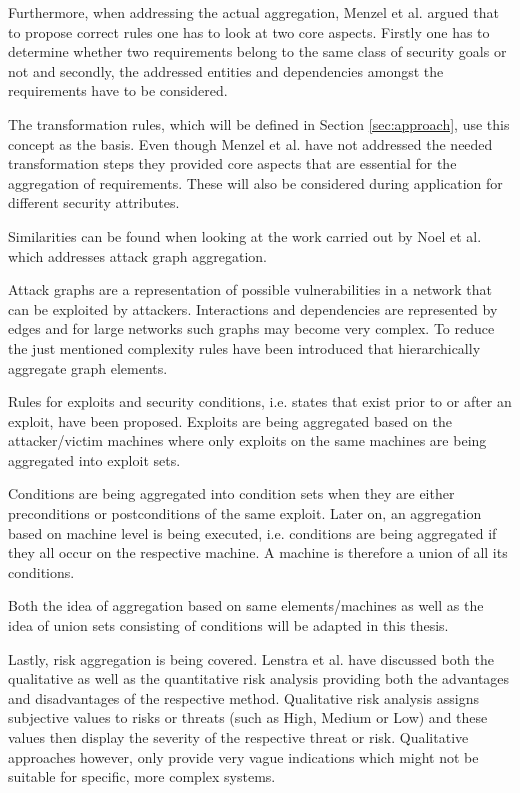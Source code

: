 Furthermore, when addressing the actual aggregation, Menzel et al. argued that to propose correct rules one has to look at two core aspects. Firstly one has to determine whether two requirements belong to the same class of security goals or not and secondly, the addressed entities and dependencies amongst the requirements have to be considered.

The transformation rules, which will be defined in Section \ref{sec:approach}, use this concept as the basis. Even though Menzel et al. have not addressed the needed transformation steps they provided core aspects that are essential for the aggregation of requirements. These will also be considered during application for different security attributes.

Similarities can be found when looking at the work carried out by Noel et al. \cite{Noel:2004:MAG:1029208.1029225} which addresses attack graph aggregation. 

Attack graphs are a representation of possible vulnerabilities in a network that can be exploited by attackers. Interactions and dependencies are represented by edges and for large networks such graphs may become very complex. To reduce the just mentioned complexity rules have been introduced that hierarchically aggregate graph elements. 

Rules for exploits and security conditions, i.e. states that exist prior to or after an exploit, have been proposed. Exploits are being aggregated based on the attacker/victim machines where only exploits on the same machines are being aggregated into exploit sets. 

Conditions are being aggregated into condition sets when they are either preconditions or postconditions of the same exploit. Later on, an aggregation based on machine level is being executed, i.e. conditions are being aggregated if they all occur on the respective machine. A machine is therefore a union of all its conditions. 

Both the idea of aggregation based on same elements/machines as well as the idea of union sets consisting of conditions will be adapted in this thesis.

Lastly, risk aggregation is being covered. Lenstra et al. \cite{Lenstra2004}  have discussed both the qualitative as well as the quantitative risk analysis providing both the advantages and disadvantages of the respective method. Qualitative risk analysis assigns subjective values to risks or threats (such as High, Medium or Low) and these values then display the severity of the respective threat or risk. Qualitative approaches however, only provide very vague indications which might not be suitable for specific, more complex systems. 

